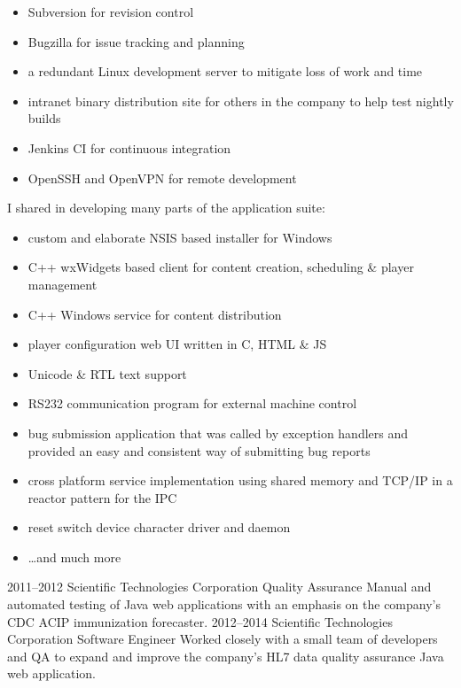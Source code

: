 \begin{entrylist}
{\begin{itemize}
                \item Subversion for revision control
                \item Bugzilla for issue tracking and planning
                \item a redundant Linux development server to mitigate loss of work and time
                \item intranet binary distribution site for others in the company to help test nightly builds
                \item Jenkins CI for continuous integration
                \item OpenSSH and OpenVPN for remote development
            \end{itemize}
            I shared in developing many parts of the application suite:
            \begin{itemize}
                \item custom and elaborate NSIS based installer for Windows
                \item C++ wxWidgets based client for content creation, scheduling \& player management
                \item C++ Windows service for content distribution
                \item player configuration web UI written in C, HTML \& JS
                \item Unicode \& RTL text support
                \item RS232 communication program for external machine control
                \item bug submission application that was called by exception handlers and provided an easy and consistent way of submitting bug reports
                \item cross platform service implementation using shared memory and TCP/IP in a reactor pattern for the IPC
                \item reset switch device character driver and daemon
                \item …and much more
            \end{itemize}
        }
    \entry
        {2011--2012}
        {Scientific Technologies Corporation}
        {Quality Assurance}
        {
            Manual and automated testing of Java web applications with an emphasis on the company's CDC ACIP immunization forecaster.
        }
    \entry
        {2012--2014}
        {Scientific Technologies Corporation}
        {Software Engineer}
        {
            Worked closely with a small team of developers and QA to expand and improve the company's
            HL7 data quality assurance Java web application.
        }
\end{entrylist}
